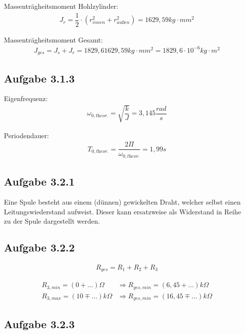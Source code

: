 \documentclass[a4paper]{scrartcl}
\numberwithin{equation}{subsection}
\begin{document}
Massenträgheitsmoment Hohlzylinder:
\begin{align}
J_r = \dfrac{1}{2} \cdot (r_{\textit{innen}}^2 + r_{\textit{außen}}^2) = 1629,59 kg \cdot mm^2
\end{align}

Massenträgheitsmoment Gesamt:
\begin{align}
J_{ges} = J_{s} + J_{r} = 1829,6 1629,59 kg \cdot mm^2 = 1829,6 \cdot 10^{-6} kg \cdot m^2
\end{align}
	
\subsection{Aufgabe 3.1.3}

Eigenfrequenz:
\begin{align}
\omega_{0,\textit{theor.}} = \sqrt{\dfrac{k}{J}} = 3,145 \dfrac{rad}{s}
\end{align}

Periodendauer:
\begin{align}
T_{0,\textit{theor.}} = \dfrac{2\Pi}{\omega_{0,\textit{theor.}}} = 1,99s
\end{align}

\subsection{Aufgabe 3.2.1}

Eine Spule besteht aus einem (dünnen) gewickelten Draht, welcher selbst einen Leitungswiederstand aufweist.
Dieser kann ersatzweise als Widerstand in Reihe zu der Spule dargestellt werden.

\subsection{Aufgabe 3.2.2}

\begin{align}
R_{ges} = R_1 + R_2 + R_3
\end{align}

\begin{align*}
R_{3,min} = (0+\dots)\Omega &\Rightarrow R_{ges,min} = (6,45+\dots)k\Omega \\
R_{3,max} = (10\mp\dots)k\Omega &\Rightarrow R_{ges,min} = (16,45\mp\dots)k\Omega
\end{align*}

\subsection{Aufgabe 3.2.3}
\end{document}
